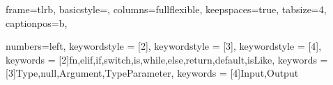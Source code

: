 

\makeatletter
\def\@makechapterhead#1{
  {\parindent \z@ \raggedright \normalfont
   \Huge\bfseries \thechapter. #1
   \par\nobreak
   \vskip 20\p@
}}
\def\@makeschapterhead#1{
  {\parindent \z@ \raggedright \normalfont
   \Huge\bfseries #1
   \par\nobreak
   \vskip 20\p@
}}
\makeatother

\def\chapwithtoc#1{
\chapter*{#1}
\addcontentsline{toc}{chapter}{#1}
}

\overfullrule=1mm


\theoremstyle{plain}
\newtheorem{defn}{Definition}

\newcommand{\pulrad}[1]{\raisebox{1.5ex}[0pt]{#1}}
\newcommand{\mc}[1]{\multicolumn{1}{c}{#1}}


\lstset
{
	frame=tlrb,
	basicstyle=\ttfamily,
  	columns=fullflexible,
  	keepspaces=true,
	tabsize=4,
	captionpos=b,
}




{
	numbers=left,
    keywordstyle = [2]{\color{key-color}},
    keywordstyle = [3]{\color{blue}},
    keywordstyle = [4]{\bfseries\color{black}},
    keywords = [2]{fn,elif,if,switch,is,while,else,return,default,isLike},
    keywords = [3]{Type,null,Argument,TypeParameter},
    keywords = [4]{Input,Output}
}

